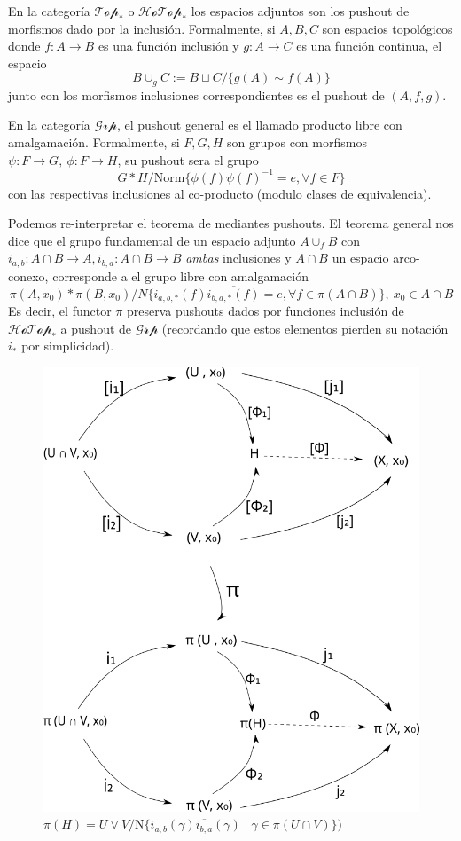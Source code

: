 En la categoría \(\mathscr{Top}_*\) o \(\mathscr{HoTop}_*\) los espacios
adjuntos son los pushout de morfismos dado por la inclusión. Formalmente,
si \(A,B,C\) son espacios topológicos donde \(f : A \to B \) es una
función inclusión y \( g : A \to C \) es una función continua, el
espacio
\[ B \cup_{g} C := B \sqcup C / \{g(A) \sim f(A)\} \]
junto con los morfismos inclusiones correspondientes es el pushout
de \( (A, f , g) \).

En la categoría \(\mathscr{Grp}\), el pushout general es el llamado
producto libre con amalgamación. Formalmente, si \(F,G,H\) son grupos
con morfismos \(\psi : F \to G ,\ \phi : F \to H\), su pushout sera el
grupo
\[ G * H / \text{Norm}\{ \phi(f) \psi(f)^{-1} = e , \forall f \in F\}\]
con las respectivas inclusiones al co-producto (modulo clases de
equivalencia).

Podemos re-interpretar el teorema de \vank mediantes pushouts. El
teorema general nos dice que el grupo fundamental de un espacio adjunto
\(A \cup_f B\) con \(i_{a,b} : A \cap B \to A, i_{b,a} : A \cap B \to B
\) \emph{ambas} inclusiones y \(A \cap B\) un espacio arco-conexo,
corresponde a el grupo libre con amalgamación
\[\pi (A, x_0) * \pi (B , x_0) / N \{i_{a,b,*} (f)
\overline{i_{b,a,*} (f)} = e , \forall f \in \pi (A \cap B)\},\ x_0 \in
A \cap B \]
Es decir, el functor \(\pi\) preserva pushouts dados por funciones
inclusión de \(\mathscr{HoTop}_*\) a pushout de \(\mathscr{Grp}\)
(recordando que estos elementos pierden su notación \(i_*\) por
simplicidad).
\begin{figure}[h]
  \centering \includegraphics[scale=0.4]{./imagenes/pushoutHotop.png}
  \caption*{\(H = (U \cup_{i_1} V, {x_0, y_0})\)}
  \caption*{\(\pi (H) = U \vee V/ \text{N}\{i_{a,b}(\gamma)\overline{i_{b,a}}
    (\gamma) \mid \gamma \in \pi(U \cap V)\})\)}
\end{figure}

